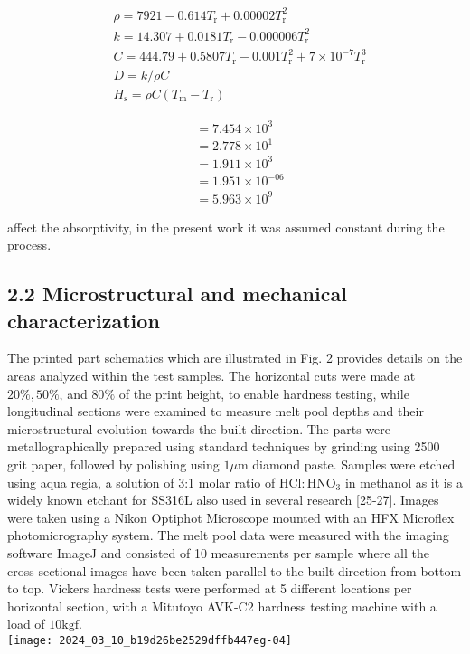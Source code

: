 \documentclass[10pt]{article}
\begin{document}
$$
\begin{aligned}
& \rho=7921-0.614 T_{\mathrm{r}}+0.00002 T_{\mathrm{r}}^{2} \\
& k=14.307+0.0181 T_{\mathrm{r}}-0.000006 T_{\mathrm{r}}^{2} \\
& C=444.79+0.5807 T_{\mathrm{r}}-0.001 T_{\mathrm{r}}^{2}+7 \times 10^{-7} T_{\mathrm{r}}^{3} \\
& D=k / \rho C \\
& H_{\mathrm{s}}=\rho C\left(T_{\mathrm{m}}-T_{\mathrm{r}}\right)
\end{aligned}
$$

$$
\begin{aligned}
& =7.454 \times 10^{3} \\
& =2.778 \times 10^{1} \\
& =1.911 \times 10^{3} \\
& =1.951 \times 10^{-06} \\
& =5.963 \times 10^{9}
\end{aligned}
$$

affect the absorptivity, in the present work it was assumed constant during the process.

\subsection*{2.2 Microstructural and mechanical characterization}
The printed part schematics which are illustrated in Fig. 2 provides details on the areas analyzed within the test samples. The horizontal cuts were made at $20 \%, 50 \%$, and $80 \%$ of the print height, to enable hardness testing, while longitudinal sections were examined to measure melt pool depths and their microstructural evolution towards the built direction. The parts were metallographically prepared using standard techniques by grinding using 2500 grit paper, followed by polishing using $1 \mu \mathrm{m}$ diamond paste. Samples were etched using aqua regia, a solution of 3:1 molar ratio of $\mathrm{HCl}: \mathrm{HNO}_{3}$ in methanol as it is a widely known etchant for SS316L also used in several research [25-27]. Images were taken using a Nikon Optiphot Microscope mounted with an HFX Microflex photomicrography system. The melt pool data were measured with the imaging software ImageJ and consisted of 10 measurements per sample where all the cross-sectional images have been taken parallel to the built direction from bottom to top. Vickers hardness tests were performed at 5 different locations per horizontal section, with a Mitutoyo AVK-C2 hardness testing machine with a load of $10 \mathrm{kgf}$.\\
\texttt{[image: 2024\_03\_10\_b19d26be2529dffb447eg-04]}
\end{document}

